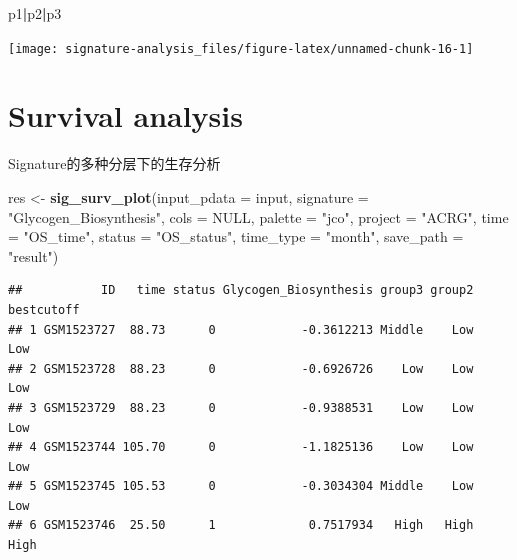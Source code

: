 \documentclass[
  12pt,
]{book}
\newenvironment{Shaded}{\begin{snugshade}}{\end{snugshade}}
\newcommand{\AttributeTok}[1]{\textcolor[rgb]{0.13,0.29,0.53}{#1}}
\newcommand{\ConstantTok}[1]{\textcolor[rgb]{0.56,0.35,0.01}{#1}}
\newcommand{\FunctionTok}[1]{\textcolor[rgb]{0.13,0.29,0.53}{\textbf{#1}}}
\newcommand{\NormalTok}[1]{#1}
\newcommand{\OtherTok}[1]{\textcolor[rgb]{0.56,0.35,0.01}{#1}}
\newcommand{\SpecialCharTok}[1]{\textcolor[rgb]{0.81,0.36,0.00}{\textbf{#1}}}
\newcommand{\StringTok}[1]{\textcolor[rgb]{0.31,0.60,0.02}{#1}}
\begin{document}
\begin{Shaded}
\begin{Highlighting}[]
\NormalTok{p1}\SpecialCharTok{|}\NormalTok{p2}\SpecialCharTok{|}\NormalTok{p3}
\end{Highlighting}
\end{Shaded}

\begin{center}\texttt{[image: signature-analysis\_files/figure-latex/unnamed-chunk-16-1]} \end{center}

\hypertarget{survival-analysis}{%
\section{Survival analysis}\label{survival-analysis}}

Signature的多种分层下的生存分析

\begin{Shaded}
\begin{Highlighting}[]
\NormalTok{res }\OtherTok{\textless{}{-}}       \FunctionTok{sig\_surv\_plot}\NormalTok{(}\AttributeTok{input\_pdata       =}\NormalTok{ input, }
                           \AttributeTok{signature         =} \StringTok{"Glycogen\_Biosynthesis"}\NormalTok{,}
                           \AttributeTok{cols              =} \ConstantTok{NULL}\NormalTok{, }
                           \AttributeTok{palette           =} \StringTok{"jco"}\NormalTok{,}
                           \AttributeTok{project           =} \StringTok{"ACRG"}\NormalTok{,}
                           \AttributeTok{time              =} \StringTok{"OS\_time"}\NormalTok{,}
                           \AttributeTok{status            =} \StringTok{"OS\_status"}\NormalTok{,}
                           \AttributeTok{time\_type         =} \StringTok{"month"}\NormalTok{,}
                           \AttributeTok{save\_path         =} \StringTok{"result"}\NormalTok{)}
\end{Highlighting}
\end{Shaded}

\begin{verbatim}
##           ID   time status Glycogen_Biosynthesis group3 group2 bestcutoff
## 1 GSM1523727  88.73      0            -0.3612213 Middle    Low        Low
## 2 GSM1523728  88.23      0            -0.6926726    Low    Low        Low
## 3 GSM1523729  88.23      0            -0.9388531    Low    Low        Low
## 4 GSM1523744 105.70      0            -1.1825136    Low    Low        Low
## 5 GSM1523745 105.53      0            -0.3034304 Middle    Low        Low
## 6 GSM1523746  25.50      1             0.7517934   High   High       High
\end{verbatim}
\end{document}
